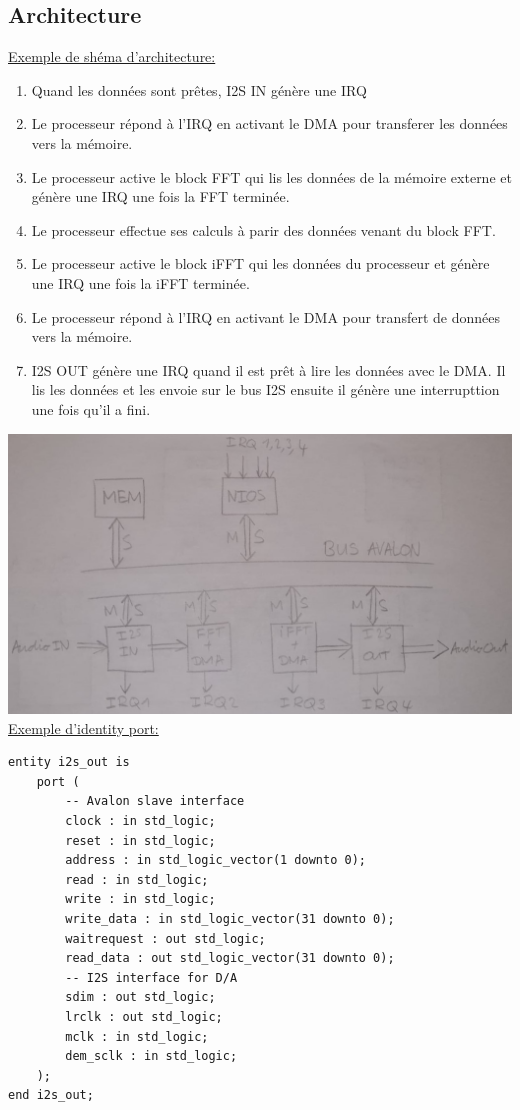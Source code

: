\subsection*{Architecture}
\underline{Exemple de shéma d'architecture:}
\begin{enumerate}[topsep=0pt, partopsep=0pt, itemsep=0pt, parsep=0pt]
    \item Quand les données sont prêtes, I2S IN génère une IRQ
    \item Le processeur répond à l'IRQ en activant le DMA pour transferer les données vers la mémoire.
    \item Le processeur active le block FFT qui lis les données de la mémoire externe et génère une IRQ une fois la FFT terminée.
    \item Le processeur effectue ses calculs à parir des données venant du block FFT.
    \item Le processeur active le block iFFT qui les données du processeur et génère une IRQ une fois la iFFT terminée.
    \item Le processeur répond à l'IRQ en activant le DMA pour transfert de données vers la mémoire.
    \item I2S OUT génère une IRQ quand il est prêt à lire les données avec le DMA. Il lis les données et les envoie sur le bus I2S ensuite il génère une interrupttion une fois qu'il a fini.
\end{enumerate}
\includegraphics[width=\columnwidth]{images/schema_exa_ex1.jpg}
\underline{Exemple d'identity port:}
\begin{verbatim}
entity i2s_out is
    port (
        -- Avalon slave interface
        clock : in std_logic;
        reset : in std_logic;
        address : in std_logic_vector(1 downto 0);
        read : in std_logic;
        write : in std_logic;
        write_data : in std_logic_vector(31 downto 0);
        waitrequest : out std_logic;
        read_data : out std_logic_vector(31 downto 0);
        -- I2S interface for D/A
        sdim : out std_logic;
        lrclk : out std_logic;
        mclk : in std_logic;
        dem_sclk : in std_logic;
    );
end i2s_out;
\end{verbatim}

